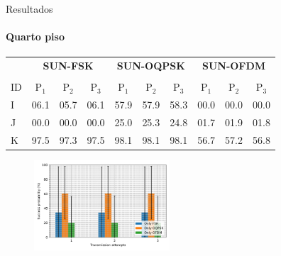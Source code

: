 \documentclass[c]{beamer}
\begin{document}
\begin{darkframes}
  \begin{frame}{Resultados}
    \framesubtitle{Quarto piso}
    \begin{table}[!b]
      \centering
      {\carlitoTLF %
        \begin{tabularx}{\textwidth}{Xccccccccc}
              & \multicolumn{3}{c|}{\textbf{SUN-FSK}} & \multicolumn{3}{c|}{\textbf{SUN-OQPSK}} & \multicolumn{3}{c}{\textbf{SUN-OFDM}}                                                             \\ \cline{2-10}                                                       \\
          ID  & {P$_1$}                               & {P$_2$}                                 & {P$_3$}                               & {P$_1$} & {P$_2$} & {P$_3$} & {P$_1$} & {P$_2$} & {P$_3$} \\ \hline
          \toprule
          {I} & 06.1                                  & 05.7                                    & 06.1                                  & 57.9    & 57.9    & 58.3    & 00.0    & 00.0    & 00.0    \\ \hline
          {J} & 00.0                                  & 00.0                                    & 00.0                                  & 25.0    & 25.3    & 24.8    & 01.7    & 01.9    & 01.8    \\ \hline
          {K} & 97.5                                  & 97.3                                    & 97.5                                  & 98.1    & 98.1    & 98.1    & 56.7    & 57.2    & 56.8    \\ \hline
        \end{tabularx}}
    \end{table}
    \begin{figure}
      \centering
      \includegraphics[width=0.45\textwidth]{resources/mod_4_floor.png}
    \end{figure}
  \end{frame}


\end{darkframes}
\end{document}

